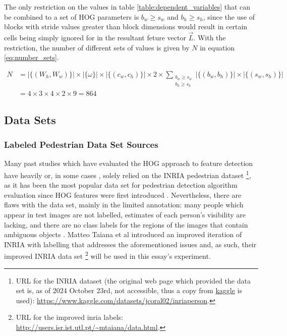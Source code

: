 The only restriction on the values in table \ref{table:dependent_variables} that can be combined to a set of HOG parameters is $b_w\ge s_w$ and $b_h\ge s_h$, since the use of blocks with stride values greater than block dimensions would result in certain cells being simply ignored for in the resultant feture vector $\vec{L}$. With the restriction, the number of different sets of values is given by $N$ in equation \ref{eq:number_sets}.

\begin{equation}\label{eq:number_sets}
\begin{split}
N &= |\{(W_h, W_w)\}| \times |\{\omega\}| \times |\{(c_w, c_h)\}| \times 2 \times \sum_{\substack{b_w \geq s_w \\ b_h \geq s_h}} |\{(b_w, b_h)\}| \times |\{(s_w, s_h)\}|  \\
&= 4 \times 3 \times 4 \times 2 \times 9  =864
\end{split}
\end{equation}

\subsection{Data Sets}

\subsubsection{Labeled Pedestrian Data Set Sources}

Many past studies which have evaluated the HOG approach to feature detection have heavily \cite{piotrdollr_2012_crosstalk} or, in some cases \cite{zhou_2021_research}, solely relied on the INRIA pedestrian dataset \footnote{URL for the INRIA dataset (the original web page which provided the data set is, as of 2024 October 23rd, not accessible, thus a copy from \href{kaggle.com}{kaggle} is used): \url{https://www.kaggle.com/datasets/jcoral02/inriaperson}.}, as it has been the most popular data set for pedestrian detection algorithm evaluation \cite{dollar_2012_pedestrian} since HOG features were first introduced \cite{dalal_2005_histograms}. Nevertheless, there are flaws with the data set, mainly in the limited annotation: many people which appear in test images are not labelled, estimates of each person’s visibility are lacking, and there are no class labels for the regions of the images that contain ambiguous objects \cite{inria_improved}. Matteo Taiana et al introduced an improved iteration of INRIA with labelling that addresses the aforementioned issues and, as such, their improved INRIA data set \footnote{URL for the improved inria labels: \url{http://users.isr.ist.utl.pt/~mtaiana/data.html}.} will be used in this essay's experiment.

